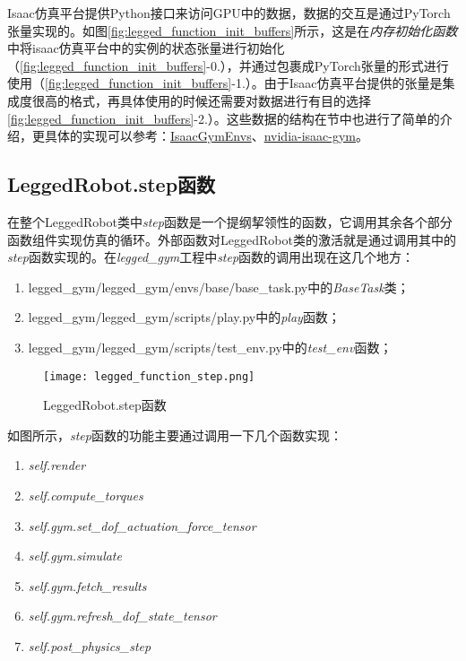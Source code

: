 Isaac仿真平台提供Python接口来访问GPU中的数据，数据的交互是通过PyTorch张量实现的。如图\ref{fig:legged_function_init_buffers}所示，这是在\emph{内存初始化函数}中将isaac仿真平台中的实例的状态张量进行初始化（\ref{fig:legged_function_init_buffers}-0.），并通过包裹成PyTorch张量的形式进行使用（\ref{fig:legged_function_init_buffers}-1.）。由于Isaac仿真平台提供的张量是集成度很高的格式，再具体使用的时候还需要对数据进行有目的选择\ref{fig:legged_function_init_buffers}-2.）。这些数据的结构在节中也进行了简单的介绍，更具体的实现可以参考：\href{https://github.com/NVIDIA-Omniverse/IsaacGymEnvs}{IsaacGymEnvs}、\href{https://developer.nvidia.com/isaac-gym}{nvidia-isaac-gym}。



\subsection[LeggedRobot.step函数]{LeggedRobot.step函数}
在整个LeggedRobot类中\emph{step}函数是一个提纲挈领性的函数，它调用其余各个部分函数组件实现仿真的循环。外部函数对LeggedRobot类的激活就是通过调用其中的\emph{step}函数实现的。在\emph{legged\_gym}工程中\emph{step}函数的调用出现在这几个地方：\begin{enumerate}
  \item legged\_gym/legged\_gym/envs/base/base\_task.py中的\emph{BaseTask}类；
  \item legged\_gym/legged\_gym/scripts/play.py中的\emph{play}函数；
  \item legged\_gym/legged\_gym/scripts/test\_env.py中的\emph{test\_env}函数；
\end{enumerate}

\begin{figure}
  \centering
  \caption[LeggedRobot.step函数]{LeggedRobot.step函数}
  \label{fig:legged_function_step}
  \texttt{[image: legged\_function\_step.png]}
\end{figure}

如图所示，\emph{step}函数的功能主要通过调用一下几个函数实现：\begin{enumerate}
  \item \emph{self.render}
  \item \emph{self.compute\_torques}
  \item \emph{self.gym.set\_dof\_actuation\_force\_tensor}
  \item \emph{self.gym.simulate}
  \item \emph{self.gym.fetch\_results}
  \item \emph{self.gym.refresh\_dof\_state\_tensor}
  \item \emph{self.post\_physics\_step}
\end{enumerate}


